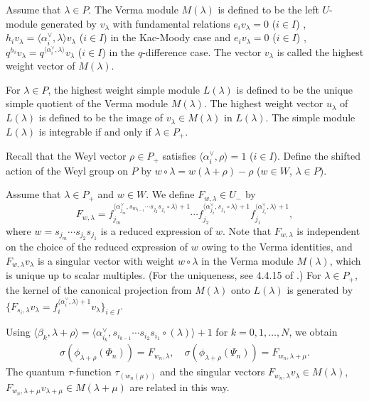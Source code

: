 \documentclass[12pt,twoside]{article}
\newcommand\bra{\langle}
\newcommand\ket{\rangle}
\newcommand\av{\alpha^\vee}
\theoremstyle{plain} %
\theoremstyle{definition} %
\theoremstyle{definition} %
\numberwithin{theorem}{section}
\numberwithin{equation}{section}
\numberwithin{figure}{section}
\numberwithin{table}{section}
\begin{document}
Assume that $\lambda\in P$.
The Verma module $M(\lambda)$ is defined to be the left $U$-module 
generated by $v_\lambda$ with fundamental relations
$e_iv_\lambda=0$ ($i\in I$) , 
$h_iv_\lambda=\bra\av_i,\lambda\ket v_\lambda$ ($i\in I$)
in the Kac-Moody case and
$e_iv_\lambda=0$ ($i\in I$) , 
$q^{h_i}v_\lambda=q^{\bra\av_i,\lambda\ket}v_\lambda$ ($i\in I$)
in the $q$-difference case.
The vector $v_\lambda$ is called the highest weight vector of $M(\lambda)$.

For $\lambda\in P$, 
the highest weight simple module $L(\lambda)$ is defined to be
the unique simple quotient of the Verma module $M(\lambda)$.
The highest weight vector $u_\lambda$ of $L(\lambda)$
is defined to be the image of $v_\lambda\in M(\lambda)$ in $L(\lambda)$.
The simple module $L(\lambda)$ is integrable if and only if $\lambda\in P_+$.

Recall that the Weyl vector $\rho\in P_+$ satisfies $\bra\av_i,\rho\ket=1$ ($i\in I$).
Define the shifted action of the Weyl group on $P$ by
$w\circ\lambda = w(\lambda+\rho)-\rho$ ($w\in W$, $\lambda\in P$).

Assume that $\lambda\in P_+$ and $w\in W$.
We define $F_{w,\lambda}\in U_-$ by
\begin{equation*}
 F_{w,\lambda}
 =
 f_{j_m}^{\bra\av_{j_m},s_{m_{l-1}}\cdots s_{j_2}s_{j_1}\circ\lambda\ket+1}
 \cdots
 f_{j_2}^{\bra\av_{j_2},s_{j_1}\circ\lambda\ket+1}
 f_{j_1}^{\bra\av_{j_1},\lambda\ket+1},
\end{equation*}
where $w=s_{j_m}\cdots s_{j_2}s_{j_1}$ is a reduced expression of $w$.
Note that $F_{w,\lambda}$ is independent on the choice of the reduced
expression of $w$ owing to the Verma identities, 
and $F_{w,\lambda}v_\lambda$ is a singular vector 
with weight $w\circ\lambda$ in the Verma module $M(\lambda)$,
which is unique up to scalar multiples.
(For the uniqueness, see 4.4.15 of \cite{Jos-1995}.)
For $\lambda\in P_+$, 
the kernel of the canonical projection from $M(\lambda)$ onto $L(\lambda)$
is generated by \(
 \{F_{s_i,\lambda}v_\lambda=f_i^{\bra\av_i,\lambda\ket+1}v_\lambda\}_{i\in I}
\).

Using 
\(
 \bra\beta_k,\lambda+\rho\ket
 = \bra\av_{i_k},s_{i_{k-1}}\cdots s_{i_2}s_{i_1}\circ(\lambda)\ket+1
\) for $k=0,1,\ldots,N$, we obtain
\begin{align*}
 \sigma(\phi_{\lambda+\rho}(\Phi_n)) = F_{w_n,\lambda},
 \quad
 \sigma(\phi_{\lambda+\rho}(\Psi_n)) = F_{w_n,\lambda+\mu}.
\end{align*}
The quantum $\tau$-function $\tau_{(w_n(\mu))}$ 
and the singular vectors 
$F_{w_n,\lambda}v_\lambda\in M(\lambda)$, 
$F_{w_n,\lambda+\mu}v_{\lambda+\mu}\in M(\lambda+\mu)$
are related in this way.
\end{document}

